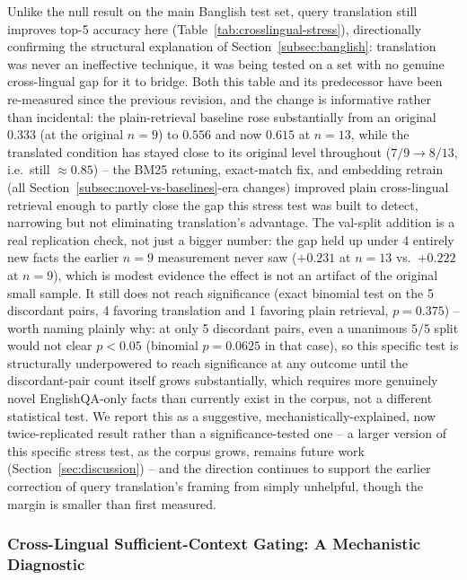 \documentclass[a4paper,twoside]{article}
\begin{document}
Unlike the null result on the main Banglish test set, query translation still improves top-5 accuracy here (Table~\ref{tab:crosslingual-stress}), directionally confirming the structural explanation of Section~\ref{subsec:banglish}: translation was never an ineffective technique, it was being tested on a set with no genuine cross-lingual gap for it to bridge. Both this table and its predecessor have been re-measured since the previous revision, and the change is informative rather than incidental: the plain-retrieval baseline rose substantially from an original $0.333$ (at the original $n=9$) to $0.556$ and now $0.615$ at $n=13$, while the translated condition has stayed close to its original level throughout ($7/9\to8/13$, i.e.\ still $\approx0.85$) -- the BM25 retuning, exact-match fix, and embedding retrain (all Section~\ref{subsec:novel-vs-baselines}-era changes) improved plain cross-lingual retrieval enough to partly close the gap this stress test was built to detect, narrowing but not eliminating translation's advantage. The val-split addition is a real replication check, not just a bigger number: the gap held up under 4 entirely new facts the earlier $n=9$ measurement never saw ($+0.231$ at $n=13$ vs.\ $+0.222$ at $n=9$), which is modest evidence the effect is not an artifact of the original small sample. It still does not reach significance (exact binomial test on the 5 discordant pairs, 4 favoring translation and 1 favoring plain retrieval, $p=0.375$) -- worth naming plainly why: at only 5 discordant pairs, even a unanimous $5/5$ split would not clear $p<0.05$ (binomial $p=0.0625$ in that case), so this specific test is structurally underpowered to reach significance at any outcome until the discordant-pair count itself grows substantially, which requires more genuinely novel EnglishQA-only facts than currently exist in the corpus, not a different statistical test. We report this as a suggestive, mechanistically-explained, now twice-replicated result rather than a significance-tested one -- a larger version of this specific stress test, as the corpus grows, remains future work (Section~\ref{sec:discussion}) -- and the direction continues to support the earlier correction of query translation's framing from simply unhelpful, though the margin is smaller than first measured.

\subsubsection{Cross-Lingual Sufficient-Context Gating: A Mechanistic Diagnostic}
\label{subsec:crosslingual-sufficient-context}
\end{document}
